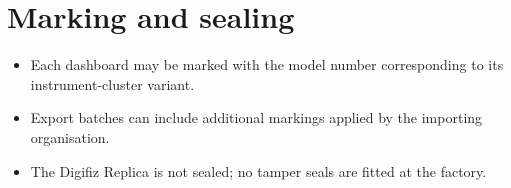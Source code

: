 \chapter{Marking and sealing}\label{ch:marking}

\begin{itemize}
    \item Each dashboard may be marked with the model number corresponding to its instrument-cluster variant.
    \item Export batches can include additional markings applied by the importing organisation.
    \item The Digifiz Replica is not sealed; no tamper seals are fitted at the factory.
\end{itemize}
